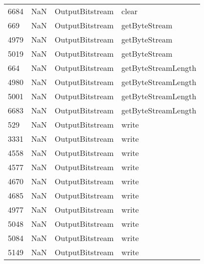 \begin{tabular}{llll}
6684 &                   NaN &            OutputBitstream &                                     clear \\
669  &                   NaN &            OutputBitstream &                             getByteStream \\
4979 &                   NaN &            OutputBitstream &                             getByteStream \\
5019 &                   NaN &            OutputBitstream &                             getByteStream \\
664  &                   NaN &            OutputBitstream &                       getByteStreamLength \\
4980 &                   NaN &            OutputBitstream &                       getByteStreamLength \\
5001 &                   NaN &            OutputBitstream &                       getByteStreamLength \\
6683 &                   NaN &            OutputBitstream &                       getByteStreamLength \\
529  &                   NaN &            OutputBitstream &                                     write \\
3331 &                   NaN &            OutputBitstream &                                     write \\
4558 &                   NaN &            OutputBitstream &                                     write \\
4577 &                   NaN &            OutputBitstream &                                     write \\
4670 &                   NaN &            OutputBitstream &                                     write \\
4685 &                   NaN &            OutputBitstream &                                     write \\
4977 &                   NaN &            OutputBitstream &                                     write \\
5048 &                   NaN &            OutputBitstream &                                     write \\
5084 &                   NaN &            OutputBitstream &                                     write \\
5149 &                   NaN &            OutputBitstream &                                     write \\

\end{tabular}
